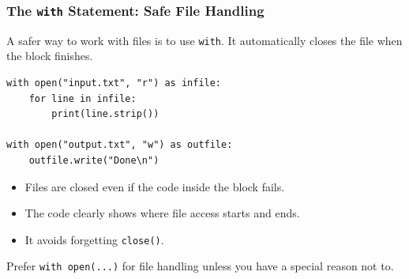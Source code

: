 \documentclass[aspectratio=169,10pt]{beamer}
\newcommand{\codeword}[1]{\texttt{#1}}
\begin{document}
\begin{frame}[fragile]
\frametitle{The \texttt{with} Statement: Safe File Handling}
\small
A safer way to work with files is to use \codeword{with}. It automatically closes the file when the block finishes.

\vspace{0.15cm}
\begin{lstlisting}[style=pycode]
with open("input.txt", "r") as infile:
    for line in infile:
        print(line.strip())

with open("output.txt", "w") as outfile:
    outfile.write("Done\n")
\end{lstlisting}

\begin{tcolorbox}[lecturebox,title=Why this matters]
\begin{itemize}\setlength\itemsep{0.08cm}
  \item Files are closed even if the code inside the block fails.
  \item The code clearly shows where file access starts and ends.
  \item It avoids forgetting \codeword{close()}.
\end{itemize}
\end{tcolorbox}

\begin{tcolorbox}[lecturebox,title=Beginner rule]
Prefer \codeword{with open(...)} for file handling unless you have a special reason not to.
\end{tcolorbox}
\end{frame}
\end{document}
